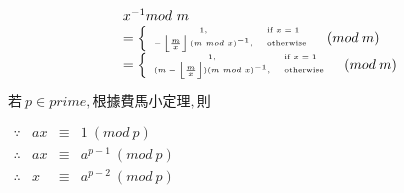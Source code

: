 \[
    \begin{array}{l}
        x^{-1} mod \ m \\
        \tiny{
            = \begin{cases}
                \begin{array}{cl}
                        1, & \text{if} \ x=1 \\
                        -\left \lfloor\frac{m}{x} \right\rfloor(m \ mod \ x)^{-1}, & \text{otherwise}
                \end{array}
            \end{cases}(mod \ m)
        } \\
        \tiny{
            = \begin{cases}
                \begin{array}{cl}
                        1, & \text{if} \ x=1 \\
                        (m-\left \lfloor\frac{m}{x} \right\rfloor)(m \ mod \ x)^{-1}, & \text{otherwise}
                \end{array}
            \end{cases}(mod \ m)
        }
    \end{array}
\]

{\raggedright
    \(若 \ p \in prime, 根據費馬小定理, 則 \) \par
    \(
        \begin{array}{rrcl}
                \because & ax & \equiv & 1 \ (mod \ p) \\
                \therefore & ax & \equiv & a^{p-1} \ (mod \ p) \\
                \therefore & x & \equiv & a^{p-2} \ (mod \ p)
        \end{array}
    \) \par
}
